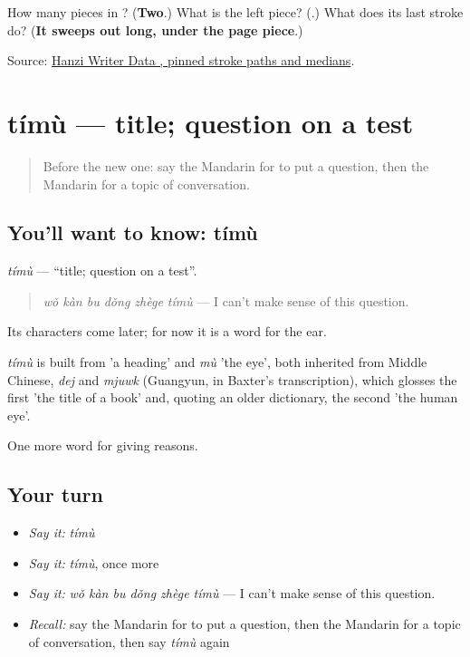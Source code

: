 \begin{tcolorbox}[breakable,colback=teal!4,colframe=teal!35!black,title={Before you move on}]
How many pieces in ? (\textbf{Two}.) What is the left piece? (\textbf{}.) What does its last stroke do? (\textbf{It sweeps out long, under the page piece}.)

Source: \href{https://raw.githubusercontent.com/chanind/hanzi-writer-data/68d10a4b21150cae5e1ebbd223eed289cf32d90c/data/\%E9\%A2\%98.json}{Hanzi Writer Data , pinned stroke paths and medians}.
\end{tcolorbox}
\section[tímù]{tímù — title; question on a test}

\label{lesson:ZH-C354-timu}



\begin{quote}
Before the new one: say the Mandarin for to put a question, then the Mandarin for a topic of conversation.
\end{quote}

\subsection*{You'll want to know: tímù}
\emph{tímù} — \textquotedblleft{}title; question on a test\textquotedblright{}.

\begin{quote}
\emph{wǒ kàn bu dǒng zhège tímù} — I can't make sense of this question.
\end{quote}

Its characters come later; for now it is a word for the ear.

\begin{cousinweb}
\emph{tímù} is built from  'a heading' and \emph{mù} 'the eye', both inherited from Middle Chinese, \emph{dej} and \emph{mjuwk} (Guangyun, in Baxter's transcription), which glosses the first 'the title of a book' and, quoting an older dictionary, the second 'the human eye'.
\end{cousinweb}

\begin{grammarlens}[title={What you've built}]
One more word for giving reasons.
\end{grammarlens}

\subsection*{Your turn}
\begin{itemize}
\raggedright
  \item \emph{Say it:} \emph{tímù}
  \item \emph{Say it:} \emph{tímù}, once more
  \item \emph{Say it:} \emph{wǒ kàn bu dǒng zhège tímù} — I can't make sense of this question.
  \item \emph{Recall:} say the Mandarin for to put a question, then the Mandarin for a topic of conversation, then say \emph{tímù} again
\end{itemize}


